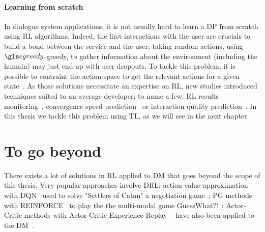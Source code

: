 \paragraph{Learning from scratch}

In dialogue system applications, it is not usually hard to learn a \gls{DP} from scratch using  \gls{RL} algorithms. Indeed, the first interactions with the user are crucials to build a bond between the service and the user; taking random actions, using $\egreedy$-greedy, to gather information about the environment (including the humain) may just end-up with user dropouts. To tackle this problem, it is possible to contraint the action-space to get the relevant actions for a given state~\parencite{singh2002,williams2008,laroche2009,laroche2010a}. As those solutions necessitate an expertise on \gls{RL}, new studies introduced techniques suited to an average developer; to name a few: \gls{RL} results monitoring~\parencite{laroche2010b}, convergence speed prediction~\parencite{elasri2013} or interaction quality prediction~\parencite{elasri2014}. In this thesis we tackle this problem using \acrfull{TL}, as we will see in the next chapter.

\section{To go beyond}

There exists a lot of solutions in \gls{RL} applied to \gls{DM} that goes beyond the scope of this thesis. Very popular approaches involve \acrfull{DRL}: action-value approximation with \gls{DQN}~\parencite{Mnih2015} used to solve "Settlers of Catan" a negotiation game~\parencite{Cuayhuitl2015StrategicDM}; \gls{PG} methods with REINFORCE~\parencite{Williams1992:REINFORCE} to play the the multi-modal game GuessWhat?!~\parencite{Vries2017-GuessWhat}; Actor-Critic methods with Actor-Critic-Experience-Replay ~\parencite{Wang2016-ACER} have also been applied to the \gls{DM}~\parencite{Weisz2018-ac-rl}.

